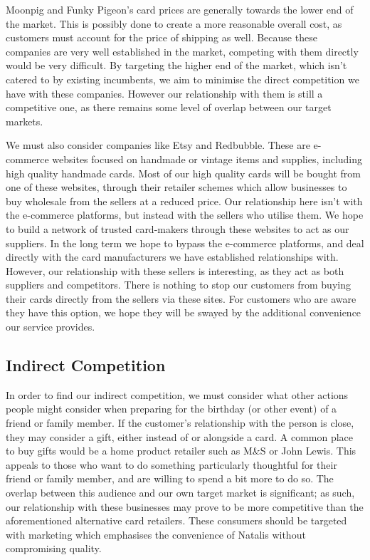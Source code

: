 \documentclass[10pt,a4paper]{article}
\begin{document}
Moonpig and Funky Pigeon's card prices are generally towards the lower end of the market. This is possibly done to create a more reasonable overall cost, as customers must account for the price of shipping as well. Because these companies are very well established in the market, competing with them directly would be very difficult. By targeting the higher end of the market, which isn't catered to by existing incumbents, we aim to minimise the direct competition we have with these companies. However our relationship with them is still a competitive one, as there remains some level of overlap between our target markets.

We must also consider companies like Etsy and Redbubble. These are e-commerce websites focused on handmade or vintage items and supplies, including high quality handmade cards. Most of our high quality cards will be bought from one of these websites, through their retailer schemes which allow businesses to buy wholesale from the sellers at a reduced price. Our relationship here isn't with the e-commerce platforms, but instead with the sellers who utilise them. We hope to build a network of trusted card-makers through these websites to act as our suppliers. In the long term we hope to bypass the e-commerce platforms, and deal directly with the card manufacturers we have established relationships with. However, our relationship with these sellers is interesting, as they act as both suppliers and competitors. There is nothing to stop our customers from buying their cards directly from the sellers via these sites. For customers who are aware they have this option, we hope they will be swayed by the additional convenience our service provides.

\subsection*{Indirect Competition}

In order to find our indirect competition, we must consider what other actions people might consider when preparing for the birthday (or other event) of a friend or family member. If the customer's relationship with the person is close, they may consider a gift, either instead of or alongside a card. A common place to buy gifts would be a home product retailer such as M\&S or John Lewis. This appeals to those who want to do something particularly thoughtful for their friend or family member, and are willing to spend a bit more to do so. The overlap between this audience and our own target market is significant; as such, our relationship with these businesses may prove to be more competitive than the aforementioned alternative card retailers. These consumers should be targeted with marketing which emphasises the convenience of Natalis without compromising quality.
\end{document}

